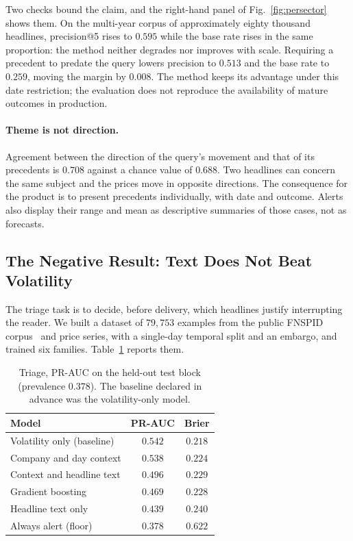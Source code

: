 \documentclass[runningheads]{llncs}
\begin{document}
Two checks bound the claim, and the right-hand panel of Fig.~\ref{fig:persector} shows
them. On the multi-year corpus of approximately eighty thousand headlines, precision@5
rises to $0.595$ while the base rate rises in the same proportion: the method neither
degrades nor improves with scale. Requiring a precedent to predate the query lowers
precision to $0.513$ and the base
rate to $0.259$, moving the margin by $0.008$. The method keeps its advantage
under this date restriction; the evaluation does not reproduce the availability of mature
outcomes in production.

\paragraph{Theme is not direction.} Agreement between the direction of the query's movement
and that of its precedents is $0.708$ against a chance value of $0.688$. Two headlines can
concern the same subject and the prices move in opposite directions. The consequence for the
product is to present precedents individually, with date and outcome. Alerts also display
their range and mean as descriptive summaries of those cases, not as forecasts.

\subsection{The Negative Result: Text Does Not Beat Volatility}

The triage task is to decide, before delivery, which headlines justify interrupting the
reader. We built a dataset of $79{,}753$ examples from the public FNSPID
corpus~\cite{dong2024fnspid} and price series, with a single-day temporal split and an
embargo, and trained six families. Table~\ref{tab:triage} reports them.

\begin{table}[t]
\centering
\caption{Triage, PR-AUC on the held-out test block (prevalence $0.378$). The baseline
declared in advance was the volatility-only model.}
\label{tab:triage}
\begin{tabular}{lcc}
\toprule
Model & PR-AUC & Brier \\
\midrule
Volatility only (baseline) & $\mathbf{0.542}$ & $0.218$ \\
Company and day context & $0.538$ & $0.224$ \\
Context and headline text & $0.496$ & $0.229$ \\
Gradient boosting & $0.469$ & $0.228$ \\
Headline text only & $0.439$ & $0.240$ \\
Always alert (floor) & $0.378$ & $0.622$ \\
\bottomrule
\end{tabular}
\end{table}
\end{document}
